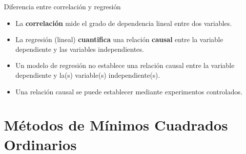 \documentclass[11pt,handout]{beamer}
\begin{document}
\begin{frame}
{Diferencia entre correlación y regresión}

\pause 

\begin{itemize}[<+->]
	\item La \textbf{correlación} mide el grado de dependencia lineal entre dos variables.
	\item La regresión (lineal) \textbf{cuantifica} una relación \textbf{causal} entre la variable dependiente y las variables independientes.
	\item Un modelo de regresión \alert{no} establece una relación causal entre la variable dependiente y la(s) variable(s) independiente(s).  
	\item Una relación causal se puede establecer mediante experimentos controlados.  	
\end{itemize}

\end{frame}

\section{Métodos de Mínimos Cuadrados Ordinarios}
\end{document}
